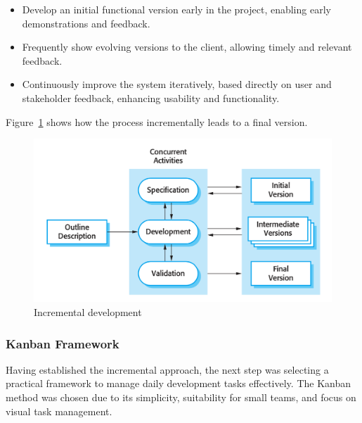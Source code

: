 \begin{mainbox}{}
    \begin{itemize}[leftmargin=*, itemsep=2pt, topsep=3pt]
        \item Develop an initial functional version early in the project, enabling early demonstrations and feedback.
    
        \item Frequently show evolving versions to the client, allowing timely and relevant feedback.
        
        \item Continuously improve the system iteratively, based directly on user and stakeholder feedback, enhancing usability and functionality.
    \end{itemize}
\end{mainbox}

Figure~\ref{fig:incremental_development} shows how the process incrementally leads  to a final version.

\begin{figure}[htbp]
        \centering
        \includegraphics[width=\textwidth]{figures/Incremental_Development.png}
        \caption{Incremental development \autocite[figure 2.2]{sommerville-2011}}
        \label{fig:incremental_development}
\end{figure}

\subsubsection{Kanban Framework}
\label{subsubsec:kanban}
Having established the incremental approach, the next step was selecting a practical framework to manage daily development tasks effectively. The Kanban method was chosen due to its simplicity, suitability for small teams, and focus on visual task management. 

